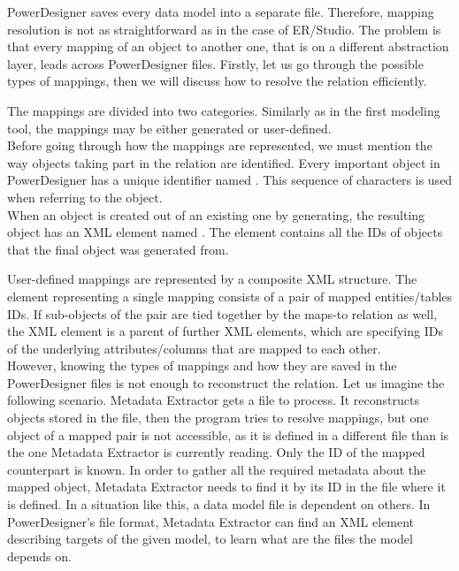 PowerDesigner saves every data model into a separate file. Therefore, mapping resolution is not as straightforward as in the case of ER/Studio. The problem is that every mapping of an object to another one, that is on a different abstraction layer, leads across PowerDesigner files.
Firstly, let us go through the possible types of mappings, then we will discuss how to resolve the relation efficiently.

The mappings are divided into two categories. 
Similarly as in the first modeling tool, the mappings may be either generated or user-defined. \\ 

Before going through how the mappings are represented, we must mention the way objects taking part in the relation are identified.
Every important object in PowerDesigner has a unique identifier named . This sequence of characters is used when referring to the object.\\

When an object is created out of an existing one by generating, the resulting object has an XML element named . The element contains all the IDs of objects that the final object was generated from.

User-defined mappings are represented by a composite XML structure. 
The element representing a single mapping consists of a pair of mapped entities/tables IDs. If sub-objects of the pair are tied together by the maps-to relation as well, the XML element is a parent of further XML elements, which are specifying IDs of the underlying attributes/columns that are mapped to each other. \\

However, knowing the types of mappings and how they are saved in the PowerDesigner files is not enough to reconstruct the relation. Let us imagine the following scenario.
Metadata Extractor gets a file to process. It reconstructs objects stored in the file, then the program tries to resolve mappings, but one object of a mapped pair is not accessible, as it is defined in a different file than is the one Metadata Extractor is currently reading.
Only the ID of the mapped counterpart is known. 
In order to gather all the required metadata about the mapped object, Metadata Extractor needs to find it by its ID in the file where it is defined.
In a situation like this, a data model file is dependent on others.
In PowerDesigner's file format, Metadata Extractor can find an XML element describing targets of the given model, to learn what are the files the model depends on.

